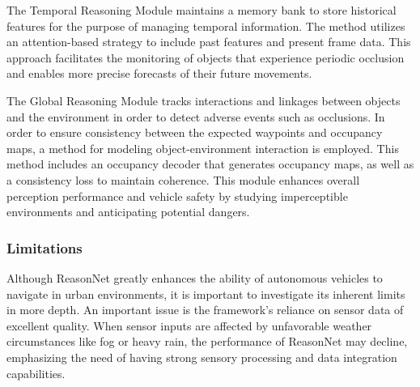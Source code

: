 The Temporal Reasoning Module maintains a memory bank to store historical features for the purpose of managing temporal information. The method utilizes an attention-based strategy to include past features and present frame data. This approach facilitates the monitoring of objects that experience periodic occlusion and enables more precise forecasts of their future movements.

The Global Reasoning Module tracks interactions and linkages between objects and the environment in order to detect adverse events such as occlusions. In order to ensure consistency between the expected waypoints and occupancy maps, a method for modeling object-environment interaction is employed. This method includes an occupancy decoder that generates occupancy maps, as well as a consistency loss to maintain coherence. This module enhances overall perception performance and vehicle safety by studying imperceptible environments and anticipating potential dangers.


\subsubsection{Limitations}

Although ReasonNet greatly enhances the ability of autonomous vehicles to navigate in urban environments, it is important to investigate its inherent limits in more depth. An important issue is the framework's reliance on sensor data of excellent quality. When sensor inputs are affected by unfavorable weather circumstances like fog or heavy rain, the performance of ReasonNet may decline, emphasizing the need of having strong sensory processing and data integration capabilities.

